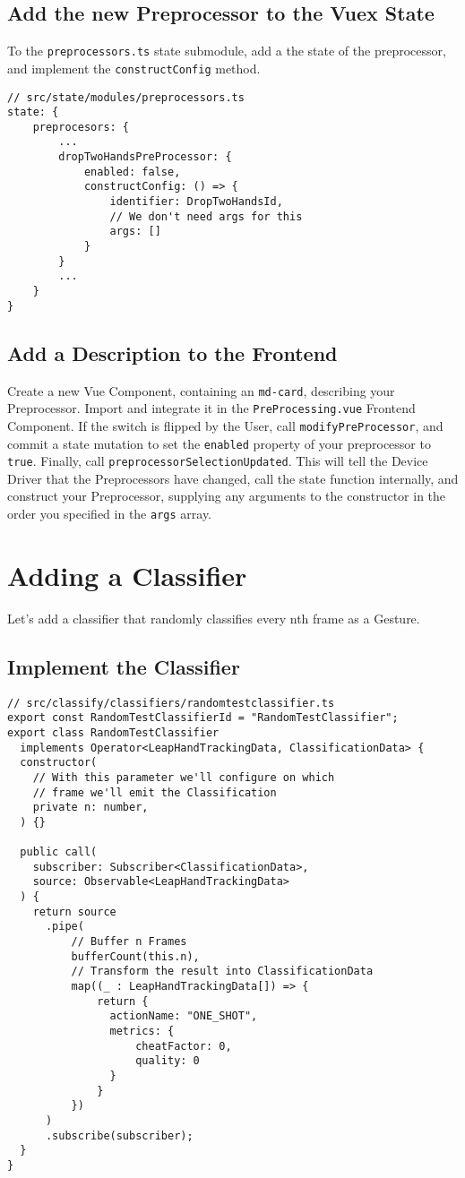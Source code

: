 \subsection{Add the new Preprocessor to the Vuex State}
To the \texttt{preprocessors.ts} state submodule, add a the state of the preprocessor, and implement the \texttt{constructConfig} method.
\begin{verbatim}
// src/state/modules/preprocessors.ts
state: {
    preprocesors: {
        ...
        dropTwoHandsPreProcessor: {
            enabled: false,
            constructConfig: () => {
                identifier: DropTwoHandsId,
                // We don't need args for this
                args: []
            }
        }
        ...
    }
}
\end{verbatim}
\subsection{Add a Description to the Frontend}
Create a new Vue Component, containing an \texttt{md-card}, describing your Preprocessor. Import and integrate it in the \texttt{PreProcessing.vue} Frontend Component. If the switch is flipped by the User, call \texttt{modifyPreProcessor}, and commit a state mutation to set the \texttt{enabled} property of your preprocessor to \texttt{true}. Finally, call \texttt{preprocessorSelectionUpdated}. This will tell the Device Driver that the Preprocessors have changed, call the state function  internally, and construct your Preprocessor, supplying any arguments to the constructor in the order you specified in the \texttt{args} array.
\section{Adding a Classifier}
Let's add a classifier that randomly classifies every nth frame as a Gesture.
\subsection{Implement the Classifier}
\begin{verbatim}
// src/classify/classifiers/randomtestclassifier.ts
export const RandomTestClassifierId = "RandomTestClassifier";
export class RandomTestClassifier
  implements Operator<LeapHandTrackingData, ClassificationData> {
  constructor(
    // With this parameter we'll configure on which
    // frame we'll emit the Classification
    private n: number,
  ) {}

  public call(
    subscriber: Subscriber<ClassificationData>,
    source: Observable<LeapHandTrackingData>
  ) {
    return source
      .pipe(
          // Buffer n Frames
          bufferCount(this.n),
          // Transform the result into ClassificationData
          map((_ : LeapHandTrackingData[]) => {
              return {
                actionName: "ONE_SHOT",
                metrics: {
                    cheatFactor: 0,
                    quality: 0
                }
              }
          })
      )
      .subscribe(subscriber);
  }
}
\end{verbatim}
